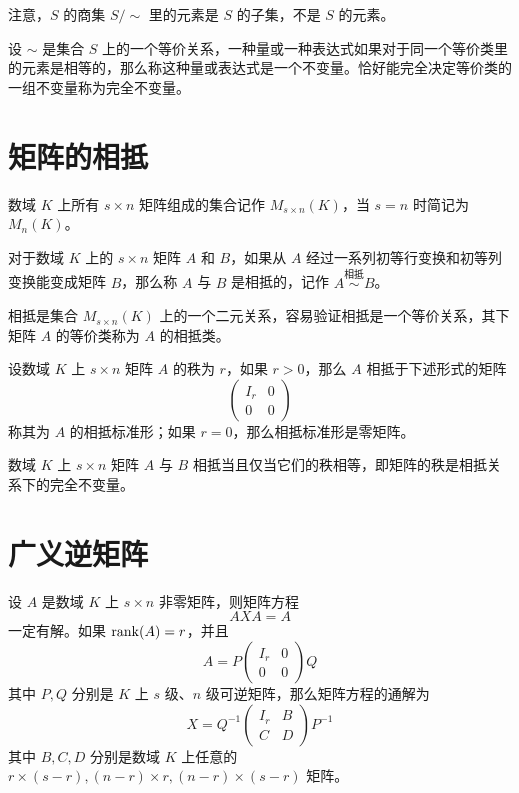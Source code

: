 注意，$S$ 的商集 $S/\sim$ 里的元素是 $S$ 的子集，不是 $S$ 的元素。

设 $\sim$ 是集合 $S$ 上的一个等价关系，一种量或一种表达式如果对于同一个等价类里的元素是相等的，那么称这种量或表达式是一个不变量。恰好能完全决定等价类的一组不变量称为完全不变量。

\section{矩阵的相抵}

数域 $K$ 上所有 $s\times n$ 矩阵组成的集合记作 $M_{s\times n}(K)$，当 $s=n$ 时简记为 $M_n(K)$。

\begin{definition}
    对于数域 $K$ 上的 $s\times n$ 矩阵 $A$ 和 $B$，如果从 $A$ 经过一系列初等行变换和初等列变换能变成矩阵 $B$，那么称 $A$ 与 $B$ 是相抵的，记作 $A\overset{\text{相抵}}{\sim}B$。
\end{definition}

相抵是集合 $M_{s\times n}(K)$ 上的一个二元关系，容易验证相抵是一个等价关系，其下矩阵 $A$ 的等价类称为 $A$ 的相抵类。

\begin{theorem}
    设数域 $K$ 上 $s\times n$ 矩阵 $A$ 的秩为 $r$，如果 $r>0$，那么 $A$ 相抵于下述形式的矩阵
    $$\left(\begin{matrix}
        I_r & 0\\
        0   & 0
    \end{matrix}\right)$$
    称其为 $A$ 的相抵标准形；如果 $r=0$，那么相抵标准形是零矩阵。
\end{theorem}

\begin{theorem}
    数域 $K$ 上 $s\times n$ 矩阵 $A$ 与 $B$ 相抵当且仅当它们的秩相等，即矩阵的秩是相抵关系下的完全不变量。
\end{theorem}

\section{广义逆矩阵}

\begin{theorem}
    设 $A$ 是数域 $K$ 上 $s\times n$ 非零矩阵，则矩阵方程
    $$AXA = A$$
    一定有解。如果 $\operatorname{rank}(A) = r$，并且
    $$A = P\left(\begin{matrix}
        I_r & 0\\
        0   & 0
    \end{matrix}\right)Q$$
    其中 $P,Q$ 分别是 $K$ 上 $s$ 级、$n$ 级可逆矩阵，那么矩阵方程的通解为
    $$X = Q^{-1}\left(\begin{matrix}
        I_r & B\\
        C   & D
    \end{matrix}\right)P^{-1}$$
    其中 $B,C,D$ 分别是数域 $K$ 上任意的 $r\times (s-r),(n-r)\times r,(n-r)\times (s-r)$ 矩阵。
\end{theorem}

